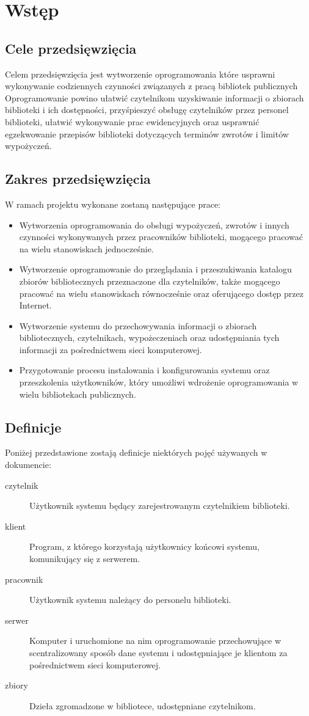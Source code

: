 \documentclass[11pt,a4paper]{article}
\begin{document}
\section{Wstęp}
\subsection{Cele przedsięwzięcia}
Celem przedsięwzięcia jest wytworzenie oprogramowania które usprawni
wykonywanie codziennych czynności związanych z pracą bibliotek publicznych
Oprogramowanie powino ułatwić czytelnikom uzyskiwanie informacji o zbiorach
biblioteki i ich dostępności, przyśpieszyć obsługę czytelników przez personel
biblioteki, ułatwić wykonywanie prac ewidencyjnych oraz usprawnić egzekwowanie
przepisów biblioteki dotyczących terminów zwrotów i limitów wypożyczeń. 

\subsection{Zakres przedsięwzięcia}
W ramach projektu wykonane zostaną następujące prace:
\begin{itemize}
  \item Wytworzenia oprogramowania do obsługi wypożyczeń, zwrotów i innych
    czynności wykonywanych przez pracowników biblioteki, mogącego
    pracować na wielu stanowiskach jednocześnie. 
  \item Wytworzenie oprogramowanie do przeglądania i przeszukiwania katalogu
    zbiorów bibliotecznych przeznaczone dla czytelników, także mogącego
    pracować na wielu stanowiskach równocześnie oraz oferującego dostęp przez
    Internet.
  \item Wytworzenie systemu do przechowywania informacji o zbiorach
    bibliotecznych, czytelnikach, wypożeczeniach oraz udostępniania tych
    informacji za pośrednictwem sieci komputerowej.
  \item Przygotowanie procesu instalowania i konfigurowania systemu oraz
    przeszkolenia użytkowników, który umożliwi wdrożenie oprogramowania w wielu
    bibliotekach publicznych.
\end{itemize}

\subsection{Definicje}
Poniżej przedstawione zostają definicje niektórych pojęć używanych w
dokumencie:
\begin{description}
  \item[czytelnik] Użytkownik systemu będący zarejestrowanym czytelnikiem
    biblioteki.
  \item[klient] Program, z którego korzystają użytkownicy końcowi systemu,
    komunikujący się z serwerem.
  \item[pracownik] Użytkownik systemu należący do personelu biblioteki.
  \item[serwer] Komputer i uruchomione na nim oprogramowanie przechowujące w
    scentralizowany sposób dane systemu i udostępniające je klientom za
    pośrednictwem sieci komputerowej.
  \item[zbiory] Dzieła zgromadzone w bibliotece, udostępniane czytelnikom.
\end{description}
\end{document}
